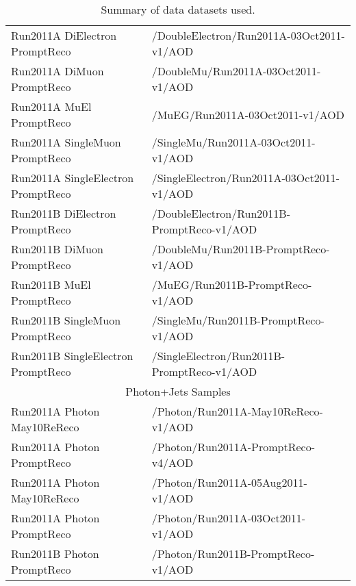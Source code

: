 \begin{table}[!ht]
\begin{center}
\begin{tabular}{|l|l|}
Run2011A DiElectron PromptReco      &  /DoubleElectron/Run2011A-03Oct2011-v1/AOD   \\
Run2011A DiMuon PromptReco          &  /DoubleMu/Run2011A-03Oct2011-v1/AOD   \\
Run2011A MuEl PromptReco            &  /MuEG/Run2011A-03Oct2011-v1/AOD   \\
Run2011A SingleMuon PromptReco      &  /SingleMu/Run2011A-03Oct2011-v1/AOD   \\
Run2011A SingleElectron PromptReco  &  /SingleElectron/Run2011A-03Oct2011-v1/AOD   \\

Run2011B DiElectron PromptReco      &  /DoubleElectron/Run2011B-PromptReco-v1/AOD   \\
Run2011B DiMuon PromptReco          &  /DoubleMu/Run2011B-PromptReco-v1/AOD   \\
Run2011B MuEl PromptReco            &  /MuEG/Run2011B-PromptReco-v1/AOD   \\
Run2011B SingleMuon PromptReco      &  /SingleMu/Run2011B-PromptReco-v1/AOD   \\
Run2011B SingleElectron PromptReco  &  /SingleElectron/Run2011B-PromptReco-v1/AOD   \\
\hline
\hline
\multicolumn{2}{|c|}{Photon+Jets Samples} \\
\hline
Run2011A Photon May10ReReco         & /Photon/Run2011A-May10ReReco-v1/AOD \\
Run2011A Photon PromptReco          & /Photon/Run2011A-PromptReco-v4/AOD \\
Run2011A Photon May10ReReco         & /Photon/Run2011A-05Aug2011-v1/AOD \\
Run2011A Photon PromptReco          & /Photon/Run2011A-03Oct2011-v1/AOD \\
Run2011B Photon PromptReco          & /Photon/Run2011B-PromptReco-v1/AOD \\

\hline
\end{tabular}
\caption{Summary of data datasets used.}
\label{tab:DatasetsData}
\end{center}
\end{table}

